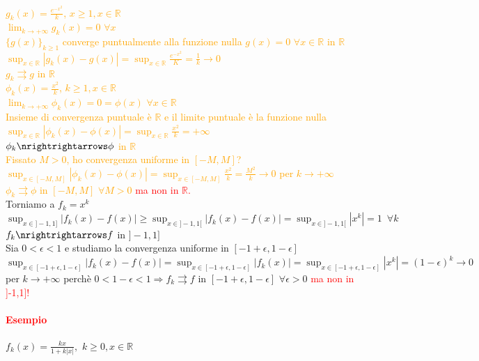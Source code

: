 \documentclass{article}
\newcommand{\R}{\mathbb{R}}
\begin{document}
\textcolor{orange}{$g_k(x)= \frac{e^{-x^2}}{k}$, $x \geq 1, x \in \R$\\
$\lim_{k \rightarrow +\infty} g_k(x)=0\,\, \forall x$\\
$\{g(x)\}_{k \geq 1}$ converge puntualmente alla funzione nulla $g(x)=0 \,\, \forall x\in\R$ in $\R$\\
$\sup_{x \in \R} |g_k(x)-g(x)|=\sup_{x\in\R} \frac{e^{-x^2}}{K}=\frac{1}{k} \rightarrow 0$\\
$g_k \rightrightarrows g$ in $\R$}\\

\textcolor{orange}{$\phi_k(x)= \frac{x^2}{k}$, $k \geq 1, x \in \R$\\
$\lim_{k \rightarrow +\infty} \phi_k(x)=0=\phi(x) \,\, \forall x \in \R$\\
Insieme di convergenza puntuale è $\R$ e il limite puntuale è la funzione nulla\\
$\sup_{x\in\R}|\phi_k(x)-\phi(x)|=\sup_{x\in\R} \frac{x^2}{k}=+\infty$\\
$\phi_k \nrightrightarrows \phi$ in $\R$\\
Fissato $M>0$, ho convergenza uniforme in $[-M,M]$?\\
$\sup_{x \in [-M,M]}|\phi_k(x)-\phi(x)|=\sup_{x\in [-M,M]} \frac{x^2}{k}=\frac{M^2}{k} \rightarrow 0$ per $k \rightarrow + \infty$\\
$\phi_k \rightrightarrows \phi$ in $[-M,M] \,\, \forall M >0$} \textcolor{red}{ma non in $\R$.}\\

Torniamo a $f_k =x^k$\\
$\sup_{x \in ]-1,1]}|f_k(x)-f(x)| \geq \sup_{x \in ]-1,1[}|f_k(x)-f(x)|= \sup_{x \in ]-1,1[}|x^k|=1\,\,\, \forall k$\\
$f_k \nrightrightarrows f$ in $]-1,1]$\\
Sia $0<\epsilon < 1$ e studiamo la convergenza uniforme in $[-1+\epsilon,1-\epsilon]$\\
$\sup_{x \in [-1+\epsilon,1-\epsilon]}|f_k(x)-f(x)|=\sup_{x \in [-1+\epsilon,1-\epsilon]}|f_k(x)|=\sup_{x \in [-1+\epsilon,1-\epsilon]}|x^k|=(1-\epsilon)^k \rightarrow 0$ per $k \rightarrow +\infty$ perchè $0<1-\epsilon <1 \Rightarrow f_k \rightrightarrows f$ in $ [-1+\epsilon, 1-\epsilon] \,\, \forall \epsilon>0$ \textcolor{red}{ma non in ]-1,1]!}

\paragraph{\textcolor{red}{Esempio}}
$f_k(x)=\frac{kx}{1+k|x|}, \,\, k \geq 0, x \in \R$\\
\end{document}
